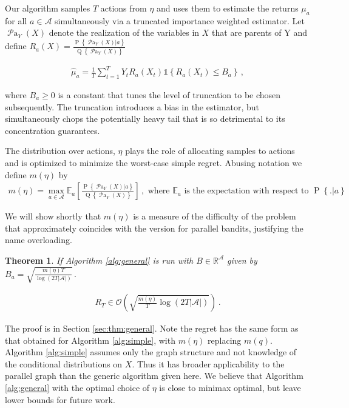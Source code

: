 \documentclass{article}
\newif\ifsup\suptrue
\newcommand{\R}{\mathbb R}
\newcommand{\set}[1]{\left\{#1\right\}}
\newcommand{\ind}[1]{\mathds{1}\!\!\set{#1}}
\newcommand{\eq}[1]{\begin{align*}#1\end{align*}}
\newcommand{\bigo}[1]{\mathcal{O}\left( #1 \right)}
\newcommand{\simpleregret}{R_T}
\newcommand{\Q}[1]{\operatorname{Q}\left\{#1\right\}}
\newcommand{\EE}{\mathbb E}
\newcommand{\EEa}{\EE_a}
\newcommand{\Pn}[2]{\operatorname{P}\left\{#2|#1\right\}}
\newcommand{\parents}[1]{\operatorname{\mathcal{P}a}_{#1}}
\newcommand{\calA}{\mathcal A}
\theoremstyle{plain}
\newtheorem{theorem}{Theorem}
\theoremstyle{definition}
\begin{document}
Our algorithm samples $T$ actions from $\eta$ and uses them to estimate the returns $\mu_a$ for all $a \in \calA$ simultaneously via a truncated importance weighted estimator. Let $\parents{Y}(X)$ denote the realization of the variables in $X$ that are parents of Y and define $R_a(X) = \frac{\Pn{a}{\parents{Y}(X)}}{\Q{\parents{Y}(X)}}$

\eq {
\hat \mu_a =  \frac{1}{T} \sum_{t=1}^T Y_t R_a(X_t)  \ind{R_a(X_t) \leq B_a}\,, 
} 

where $ B_a \geq 0$  is a constant that tunes the level of truncation to be chosen subsequently. The truncation introduces a bias in the estimator, but simultaneously chops the potentially heavy tail that is so detrimental to its concentration guarantees. 

The distribution over actions, $\eta$ plays the role of allocating samples to actions and is optimized to minimize the worst-case simple regret. Abusing notation we define $m(\eta)$ by
\eq{
m(\eta) = \max_{a \in \calA} \EEa\left[\frac{\Pn{a}{\parents{Y}(X)}}{\Q{\parents{Y}(X)}}\right]\,,\text{ where } \EEa \text{ is the expectation with respect to } \Pn{a}.
}

We will show shortly that $m(\eta)$ is a measure of the difficulty of the problem that approximately coincides with the version for parallel bandits, justifying the name overloading.

\begin{theorem}\label{thm:general}
If Algorithm \ref{alg:general} is run with $B \in \R^{\calA}$ given by $B_a = \sqrt{\frac{m(\eta)T}{\log\left(2T|\calA|\right)}}\,.$

\eq{
\simpleregret \in \bigo{\sqrt{\frac{m(\eta)}{T} \log\left(2T|\calA|\right)}}\,.
}
\end{theorem}
\ifsup 
The proof is in Section \ref{sec:thm:general}.
\else
The proof is in the supplementary materials.
\fi Note the regret has the same form as that obtained for Algorithm \ref{alg:simple}, with $m(\eta)$ replacing $m(q)$. Algorithm \ref{alg:simple} assumes only the graph structure and not knowledge of the conditional distributions on $X$. Thus it has broader applicability to the parallel graph than the generic algorithm given here. We believe that Algorithm \ref{alg:general} with the optimal choice of $\eta$ is close to minimax optimal, but leave lower bounds
for future work.
\end{document}
